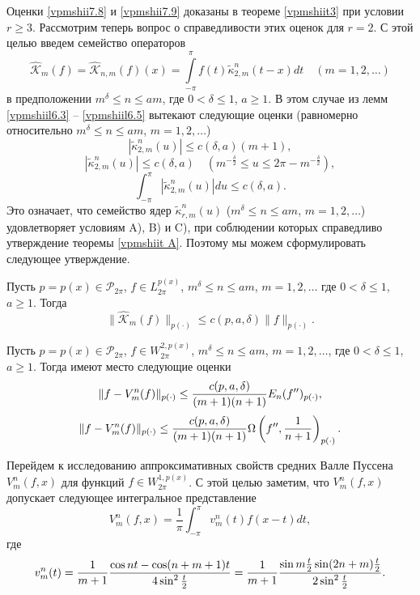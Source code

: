 Оценки \eqref{vpmshii7.8} и  \eqref{vpmshii7.9} доказаны в теореме \ref{vpmshiit3} при условии $r\ge3$.
Рассмотрим теперь вопрос о справедливости этих оценок для $r=2$. С этой целью введем семейство операторов
\begin{equation}\label{vpmshii7.10}
    \hat{\mathcal{ K}}_m(f)=\hat{\mathcal{ K}}_{n,m}(f)(x)=
\int\limits_{-\pi}^{\pi}f(t)\tilde\kappa_{2,m}^{n}(t-x)dt\quad(m=1,2,\ldots)
\end{equation}
в предположении $m^\delta\le n\le am$, где $0<\delta\le 1$, $a\ge1$. В этом случае из лемм \ref{vpmshiil6.3} -- \ref{vpmshiil6.5} вытекают следующие оценки (равномерно относительно $m^\delta\le n\le am$, $m=1,2,\ldots$)
 $$
 |\tilde\kappa_{2,m}^{n}(u)|\le c(\delta,a)(m+1),
 $$
$$
 |\tilde\kappa_{2,m}^{n}(u)|\le c(\delta,a) \quad (m^{-\frac\delta2}\le u\le2\pi-m^{-\frac\delta2}),
 $$
$$
\int_{-\pi}^\pi |\tilde\kappa_{2,m}^{n}(u)|du \le c(\delta,a).
$$
Это означает, что семейство ядер $ \tilde\kappa_{r,m}^{n}(u)$ ($m^\delta\le n\le am$, $m=1,2,\ldots$) удовлетворяет условиям A), B) и C), при соблюдении которых справедливо утверждение теоремы \ref{vpmshiit A}. Поэтому мы можем сформулировать следующее утверждение.
\begin{lemma}\label{vpmshiil7.2}
 Пусть $p=p(x)\in\mathcal{ P}_{2\pi}$, $f\in L^{p(x)}_{2\pi}$, $m^\delta\le n\le am$, $m=1,2,\ldots$ где $0<\delta\le 1$, $a\ge1$. Тогда
$$\|\hat{\mathcal{ K}}_{m}(f)\|_{p(\cdot)}\le c(p,a,\delta)\|f\|_{p(\cdot)}.$$
  \end{lemma}


\begin{theorem}\label{vpmshiit4}
Пусть  $p=p(x)\in\mathcal{  P}_{2\pi}$,  $f\in W^{2,p(x)}_{2\pi}$, $m^\delta\le n\le am$, $m=1,2,\ldots$, где $0<\delta\le 1$, $a\ge1$. Тогда имеют место следующие оценки
\begin{equation}\label{vpmshii7.11}
   \|f-V_m^n(f)\|_{p(\cdot)}\le {c(p,a,\delta)\over(m+1) (n+1)}E_n(f'')_{p(\cdot)},
\end{equation}
\begin{equation}\label{vpmshii7.12}
   \|f-V_m^n(f)\|_{p(\cdot)}\le {c(p,a,\delta)\over(m+1) (n+1)}\Omega\left(f'',\frac1{n+1}\right)_{p(\cdot)}.
\end{equation}
\end{theorem}


Перейдем к исследованию аппроксимативных свойств средних Валле Пуссена $V_m^n(f,x)$ для функций $f\in W^{1,p(x)}_{2\pi}$. С этой целью
заметим, что $V_m^n(f,x)$ допускает следующее интегральное представление
\begin{equation}\label{vpmshii7.13}
    V_m^n(f,x)=\frac1\pi\int_{-\pi}^\pi v_m^n(t)f(x-t)dt,
\end{equation}
где
\begin{equation}\label{vpmshii7.14}
    v_m^n(t)=\frac1{m+1}{\cos nt-\cos(n+m+1)t\over4\sin^2\frac{t}{2}}=\frac1{m+1}{\sin m\frac{t}{2}\sin(2n+m)\frac{t}{2}\over2\sin^2\frac{t}{2}}.
\end{equation}

